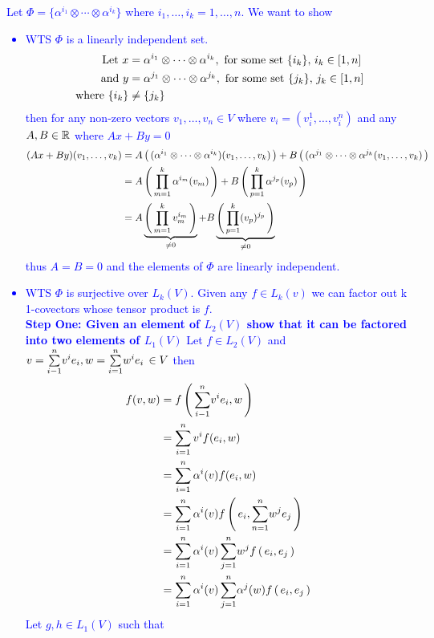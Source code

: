 \documentclass[10pt,a4paper]{report}
\newcommand{\BLUE}[1]{\textcolor{blue}{#1}}
\begin{document}
\begin{enumerate}[label=3.\arabic*.]
	\BLUE{Let $\Phi = \{\alpha^{i_1}\otimes \cdots \otimes \alpha^{i_k}\}$ where $i_1, \dots, i_k = 1, \dots, n$.  We want to show
	\begin{itemize}
		\item WTS $\Phi$ is a linearly independent set.
		\begin{align*}
			\text{Let } x &= \alpha^{i_1}\otimes \cdots \otimes \alpha^{i_k}, \text{ for some set } \{i_k\},\, i_k\in [1,n] \\
			\text{ and } y &= \alpha^{j_1}\otimes \cdots \otimes \alpha^{j_k}, \text{ for some set } \{j_k\},\, j_k\in [1,n] \\
			\text{ where } \{i_k\} &\ne \{j_k\}
		\end{align*}then for any non-zero vectors $v_1, \dots, v_n \in V$ where $v_i=(v_i^1,\dots, v_i^n)$ and any $A, B \in \mathbb{R}$ where $Ax +By = 0$
		\begin{align*}
			(Ax+By)(v_1,\dots,v_k) &= A\left (\, (\alpha^{i_1}\otimes \cdots \otimes \alpha^{i_k})(v_1,\dots,v_k) \,\right ) + B\left (\, (\alpha^{j_1}\otimes \cdots \otimes \alpha^{j_k}(v_1,\dots,v_k) \,\right ) \\
			&= A\left (\, \prod_{m=1}^k\alpha^{i_m}(v_m) \,\right )+B\left (\, \prod_{p=1}^k\alpha^{j_p}(v_p) \,\right )\\
			&= A\underbrace{\left (\, \prod_{m=1}^kv_m^{i_m} \,\right )}_{\ne 0}+B\underbrace{\left (\, \prod_{p=1}^k(v_p)^{j_p} \,\right )}_{\ne 0}
		\end{align*}thus $A = B = 0$ and the elements of $\Phi$ are linearly independent.\\ 
		\item WTS $\Phi$ is surjective over $L_k(V)$. Given any $f \in L_k(v)$ we can factor out k 1-covectors whose tensor product is $f$.  \\
	\textbf{Step One: Given an element of $L_2(V)$ show that it can be factored into two elements of $L_1(V)$} 
	Let $f \in L_2(V)$ and $v=\underset{i-1}{\overset{n}{\sum}} v^ie_i, w=\underset{i=1}{\overset{n}{\sum}} w^ie_i \, \in V$ then
	\begin{align*}
		f(v, w) &= f\left (\, \underset{i-1}{\overset{n}{\sum}} v^ie_i, w \,\right ) \\
		&= \sum_{i=1}^n v^i f(e_i, w) \\
		&= \sum_{i=1}^n \alpha^i(v) f(e_i, w) \\
		&= \sum_{i=1}^n \alpha^i(v) f\left (\, e_i, \underset{n=1}{\overset{n}{\sum}} w^je_j \,\right ) \\
		&= \sum_{i=1}^n \alpha^i(v)\, \underset{j=1}{\overset{n}{\sum}} w^j f\left (\, e_i, e_j \,\right ) \\
		&= \sum_{i=1}^n \alpha^i(v)\, \underset{j=1}{\overset{n}{\sum}} \alpha^j(w) f\left (\, e_i, e_j \,\right )
	\end{align*}Let $g,h \in L_1(V)$ such that 

\end{itemize}}
\end{enumerate}
\end{document}
